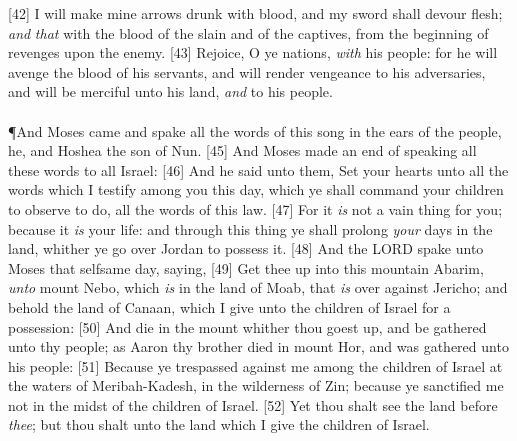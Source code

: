[42] \textcolor[cmyk]{0.99998,1,0,0}{I will make mine arrows drunk with blood, and my sword shall devour flesh; \emph{and} \emph{that} with the blood of the slain and of the captives, from the beginning of revenges upon the enemy.}
[43] \textcolor[cmyk]{0.99998,1,0,0}{Rejoice, O ye nations, \emph{with} his people: for he will avenge the blood of his servants, and will render vengeance to his adversaries, and will be merciful unto his land, \emph{and} to his people.}\\
\\
\P \textcolor[cmyk]{0.99998,1,0,0}{And Moses came and spake all the words of this song in the ears of the people, he, and Hoshea the son of Nun.}
[45] \textcolor[cmyk]{0.99998,1,0,0}{And Moses made an end of speaking all these words to all Israel:}
[46] \textcolor[cmyk]{0.99998,1,0,0}{And he said unto them, Set your hearts unto all the words which I testify among you this day, which ye shall command your children to observe to do, all the words of this law.}
[47] \textcolor[cmyk]{0.99998,1,0,0}{For it \emph{is} not a vain thing for you; because it \emph{is} your life: and through this thing ye shall prolong \emph{your} days in the land, whither ye go over Jordan to possess it.}
[48] \textcolor[cmyk]{0.99998,1,0,0}{And the LORD spake unto Moses that selfsame day, saying,}
[49] \textcolor[cmyk]{0.99998,1,0,0}{Get thee up into this mountain Abarim, \emph{unto} mount Nebo, which \emph{is} in the land of Moab, that \emph{is} over against Jericho; and behold the land of Canaan, which I give unto the children of Israel for a possession:}
[50] \textcolor[cmyk]{0.99998,1,0,0}{And die in the mount whither thou goest up, and be gathered unto thy people; as Aaron thy brother died in mount Hor, and was gathered unto his people:}
[51] \textcolor[cmyk]{0.99998,1,0,0}{Because ye trespassed against me among the children of Israel at the waters of Meribah-Kadesh, in the wilderness of Zin; because ye sanctified me not in the midst of the children of Israel.}
[52] \textcolor[cmyk]{0.99998,1,0,0}{Yet thou shalt see the land before \emph{thee}; but thou shalt  unto the land which I give the children of Israel.}
